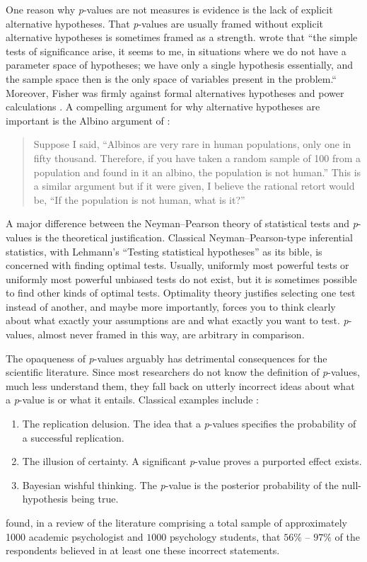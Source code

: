 One reason why \textit{p}-values are not measures is evidence is the lack of explicit alternative hypotheses. That \textit{p}-values are usually framed without explicit alternative hypotheses is sometimes framed as a strength. \textcite[p. 308]{Barnard1962-rz} wrote that ``the simple tests of significance arise, it seems to me, in situations where we do not have a parameter space of hypotheses; we have only a single hypothesis essentially, and the sample space then is the only space of variables present in the problem.`` Moreover, Fisher was firmly against formal alternatives hypotheses and power calculations \parencite{Lehmann1993-oa}. A compelling argument for why alternative hypotheses are important is the Albino argument of \textcite{Berkson1942-hj}:
\begin{quotation}
Suppose I said, \textquotedblleft Albinos are very rare in human populations, only one in fifty thousand. Therefore, if you have taken a random sample of 100 from a population and found in it an albino, the population is not human.\textquotedblright{} This is a similar argument but if it were given, I believe the rational retort would be, \textquotedblleft If the population is not human, what is it?\textquotedblright{} 
\end{quotation}
A major difference between the Neyman--Pearson theory of statistical tests and \textit{p}-values is the theoretical justification. Classical Neyman--Pearson-type inferential statistics, with Lehmann's ``Testing statistical hypotheses'' \parencite{Lehmann2005-sp} as its bible, is concerned with finding optimal tests. Usually, uniformly most powerful tests or uniformly most powerful unbiased tests do not exist, but it is sometimes possible to find other kinds of optimal tests. Optimality theory justifies selecting one test instead of another, and maybe more importantly, forces you to think clearly about what exactly your assumptions are and what exactly you want to test. \textit{p}-values, almost never framed in this way, are arbitrary in comparison.

The opaqueness of \textit{p}-values arguably has detrimental consequences for the scientific literature. Since most researchers do not know the definition of \textit{p}-values, much less understand them, they fall back on utterly incorrect ideas about what a \textit{p}-value is or what it entails. Classical examples include \parencite{Gigerenzer2018-oi}:
\begin{enumerate}[label=(\alph*)]
    \item The replication delusion. The idea that a  \textit{p}-values specifies the probability of a successful replication.
    \item The illusion of certainty. A significant \textit{p}-value proves a purported effect exists.
    \item Bayesian wishful thinking. The \textit{p}-value is the posterior probability of the null-hypothesis being true.
\end{enumerate}
\textcite{Gigerenzer2018-oi} found, in a review of the literature comprising a total sample of approximately 1000 academic psychologist and $1000$ psychology students, that $56\%$ -- $97\%$ of the respondents believed in at least one these incorrect statements. 

